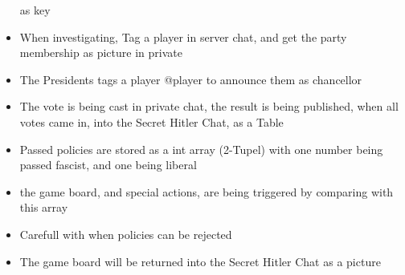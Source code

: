 \begin{itemize}
    as key
  \item When investigating, Tag a player in server chat, and get the party membership as picture in
    private
  \item The Presidents tags a player @player to announce them as chancellor
  \item The vote is being cast in private chat, the result is being published, when all votes came
    in, into the Secret Hitler Chat, as a Table
  \item Passed policies are stored as a int array (2-Tupel) with one number being passed fascist,
    and one being liberal
  \item the game board, and special actions, are being triggered by comparing with this array
  \item {\color{red}Carefull with when policies can be rejected}
  \item The game board will be returned into the Secret Hitler Chat as a picture
\end{itemize}
